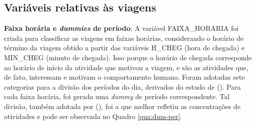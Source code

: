 \subsection{Variáveis relativas às viagens}\label{subsec:novas-var-viag}

\begin{compactitem}

\item \textbf{Faixa horária e \textit{dummies} de período}: A variável FAIXA_HORARIA foi criada para classificar as viagens em faixas horárias, considerando o horário de término da viagem obtido a partir das variáveis H_CHEG (hora de chegada) e MIN_CHEG (minuto de chegada).
Isso porque o horário de chegada corresponde ao horário de início da atividade que motivou a viagem, e são as atividades que, de fato, interessam e motivam o comportamento humano. 
Foram adotadas sete categorias para a divisão dos períodos do dia, derivados do estudo de  (\citeyear{VESPUCCI2003}).
Para cada faixa horária, foi gerada uma \textit{dummy} de período correspondente. Tal divisão, também adotada por  (\citeyear{GERMANI2005}), foi a que melhor refletiu as concentrações de atividades e pode ser observada no Quadro \ref{qua:dum-per}.

\begin{quadro}[htb]
\end{quadro}



\end{compactitem}
